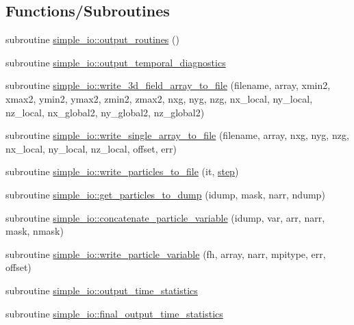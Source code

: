 \subsection*{Functions/\+Subroutines}
\begin{DoxyCompactItemize}
\item 
subroutine \hyperlink{namespacesimple__io_afa460efbda992ca175d786f86ab09ee9}{simple\+\_\+io\+::output\+\_\+routines} ()
\item 
subroutine \hyperlink{namespacesimple__io_acb0fc119c4f9a03b88d4129ec0036e1c}{simple\+\_\+io\+::output\+\_\+temporal\+\_\+diagnostics}
\item 
subroutine \hyperlink{namespacesimple__io_a2100e8a4cfe3bc3c9e2dcc93988d6551}{simple\+\_\+io\+::write\+\_\+3d\+\_\+field\+\_\+array\+\_\+to\+\_\+file} (filename, array,                                                               xmin2, xmax2, ymin2, ymax2, zmin2, zmax2, nxg, nyg, nzg, nx\+\_\+local,                                               ny\+\_\+local, nz\+\_\+local, nx\+\_\+global2, ny\+\_\+global2, nz\+\_\+global2)
\item 
subroutine \hyperlink{namespacesimple__io_a506cc0f775048e27bb5ccd9e936592d3}{simple\+\_\+io\+::write\+\_\+single\+\_\+array\+\_\+to\+\_\+file} (filename, array, nxg, nyg, nzg, nx\+\_\+local, ny\+\_\+local, nz\+\_\+local, offset, err)
\item 
subroutine \hyperlink{namespacesimple__io_a02b043d1424f1b2d25e47a55e697a5aa}{simple\+\_\+io\+::write\+\_\+particles\+\_\+to\+\_\+file} (it, \hyperlink{submain_8_f90_ae0a3ce7909f5d34b3684e226b780a075}{step})
\item 
subroutine \hyperlink{namespacesimple__io_abb3c1220ac70ea28fcbce1cd9c03b294}{simple\+\_\+io\+::get\+\_\+particles\+\_\+to\+\_\+dump} (idump, mask, narr, ndump)
\item 
subroutine \hyperlink{namespacesimple__io_a97c3b871fecd4b1341301fa6cf00a8fa}{simple\+\_\+io\+::concatenate\+\_\+particle\+\_\+variable} (idump, var, arr, narr, mask, nmask)
\item 
subroutine \hyperlink{namespacesimple__io_aad8ee8298c20d69fabcd6eb5a8b7b620}{simple\+\_\+io\+::write\+\_\+particle\+\_\+variable} (fh, array, narr, mpitype, err, offset)
\item 
subroutine \hyperlink{namespacesimple__io_a87d8855ebcd3134e3cfaeb7f6c548249}{simple\+\_\+io\+::output\+\_\+time\+\_\+statistics}
\item 
subroutine \hyperlink{namespacesimple__io_a4f7eec6a6854f8127e7bfdfa307d7bb9}{simple\+\_\+io\+::final\+\_\+output\+\_\+time\+\_\+statistics}
\end{DoxyCompactItemize}
